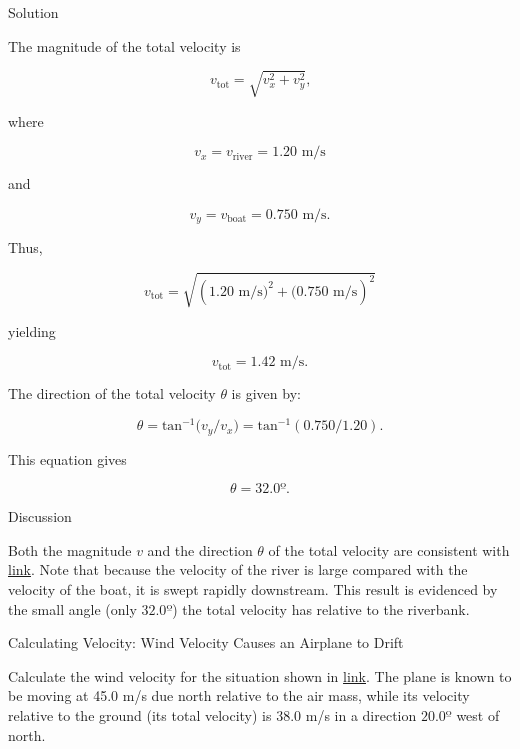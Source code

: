 \documentclass[
]{book}
\newenvironment{tinysection}{}{}
\begin{document}
\begin{tinysection}

{Solution}

\end{tinysection}

The magnitude of the total velocity is

\leavevmode\hypertarget{eip-120}{}%
\[{{v_{\text{tot}} = \sqrt{v_{x}^{2} + v_{y}^{2}}}\text{,}}{}\]

where

\leavevmode\hypertarget{eip-845}{}%
\[{{{v_{x} = v_{\text{river}}} = 1}\text{.}\text{20\ m/s}}{}\]

and

\leavevmode\hypertarget{eip-311}{}%
\[{{{v_{y} = v_{\text{boat}}} = 0}\text{.}\text{750\ m/s.}}{}\]

Thus,

\leavevmode\hypertarget{eip-869}{}%
\[{v_{\text{tot}} = \sqrt{(1\text{.}\text{20\ m/s}{)^{2} + (}0\text{.}\text{750\ m/s})^{2}}}{}\]

yielding

\leavevmode\hypertarget{eip-166}{}%
\[{{v_{\text{tot}} = 1}\text{.}\text{42\ m/s.}}{}\]

The direction of the total velocity \(\theta{}\) is given by:

\leavevmode\hypertarget{eip-862}{}%
\[{{\theta = \text{tan}^{- 1}}({v_{y}/v_{x}}{) = \text{tan}^{- 1}}(0\text{.}{\text{750}/1}\text{.}\text{20})}\text{.}{}\]

This equation gives

\leavevmode\hypertarget{eip-16}{}%
\[{{{\theta = \text{32}}\text{.}0º}\text{.}}{}\]

\begin{tinysection}

{Discussion}

\end{tinysection}

Both the magnitude \(v\) and the direction \(\theta\) of the total velocity
are consistent with
\protect\hyperlink{import-auto-id2070798}{link}. Note that
because the velocity of the river is large compared with the velocity of
the boat, it is swept rapidly downstream. This result is evidenced by
the small angle (only \(32.0º\)) the total velocity has relative to the
riverbank.

\hypertarget{fs-id1088238}{}
Calculating Velocity: Wind Velocity Causes an Airplane to Drift

Calculate the wind velocity for the situation shown in
\protect\hyperlink{import-auto-id1546060}{link}. The plane is
known to be moving at 45.0 m/s due north relative to the air mass, while
its velocity relative to the ground (its total velocity) is 38.0 m/s in
a direction \({\text{20}\text{.0º}}{}\) west of north.
\end{document}
